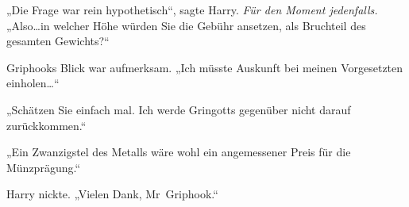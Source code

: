„Die Frage war rein hypothetisch“, sagte Harry. \emph{Für den Moment jedenfalls.} „Also…in welcher Höhe würden Sie die Gebühr ansetzen, als Bruchteil des gesamten Gewichts?“

Griphooks Blick war aufmerksam. „Ich müsste Auskunft bei meinen Vorgesetzten einholen…“

„Schätzen Sie einfach mal. Ich werde Gringotts gegenüber nicht darauf zurückkommen.“

„Ein Zwanzigstel des Metalls wäre wohl ein angemessener Preis für die Münzprägung.“

Harry nickte. „Vielen Dank, Mr~Griphook.“

